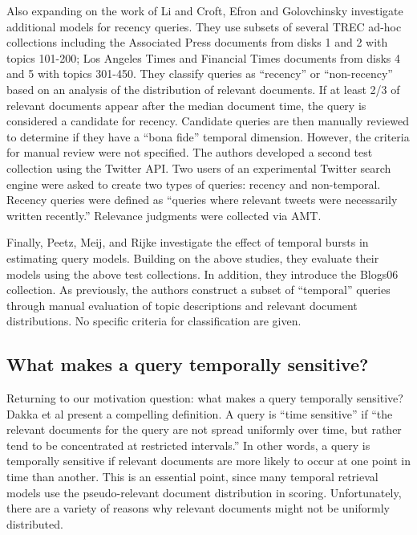 \documentclass[runningheads,a4paper]{llncs}
\begin{document}
Also expanding on the work of Li and Croft, Efron and Golovchinsky \cite{Efron2011} investigate additional models for recency queries. They use subsets of several TREC ad-hoc collections including the Associated Press documents from disks 1 and 2 with topics 101-200; Los Angeles Times and Financial Times documents from disks 4 and 5 with topics 301-450. They classify queries as ``recency'' or ``non-recency'' based on an analysis of the distribution of relevant documents. If at least 2/3 of relevant documents appear after the median document time, the query is considered a candidate for recency. Candidate queries are then manually reviewed to determine if they have a ``bona fide'' temporal dimension. However, the criteria for manual review were not specified.  The authors developed a second test collection using the Twitter API. Two users of an experimental Twitter search engine were asked to create two types of queries: recency and non-temporal. Recency queries were defined as ``queries where relevant tweets were necessarily written recently.''  Relevance judgments were collected via AMT. 

Finally, Peetz, Meij, and Rijke \cite{Peetz2013} investigate the effect of temporal bursts in estimating query models. Building on the above studies, they evaluate their models using the above test collections. In addition, they introduce the Blogs06 collection. As previously, the authors construct a subset of ``temporal'' queries through manual evaluation of topic descriptions and relevant document distributions. No specific criteria for classification are given.

\subsection{What makes a query temporally sensitive?}

Returning to our motivation question: what makes a query temporally sensitive? Dakka et al \cite{Dakka2012} present a compelling definition. A query is ``time sensitive''  if  ``the relevant documents for the query are not spread uniformly over time, but rather tend to be concentrated at restricted intervals.''  In other words, a query is temporally sensitive if relevant documents are more likely to occur at one point in time than another.  This is an essential point, since many temporal retrieval models use the pseudo-relevant document distribution in scoring. Unfortunately, there are a variety of reasons why relevant documents might not be uniformly distributed.
\end{document}
